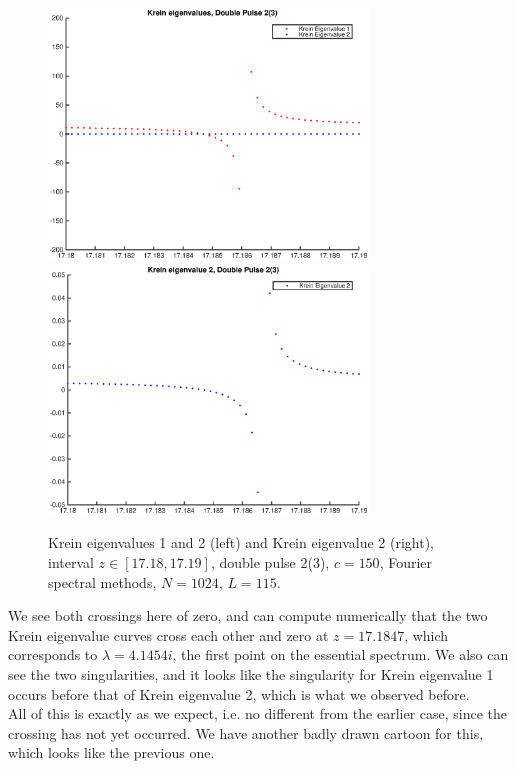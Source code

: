 \documentclass[12pt]{article}
\begin{document}
\begin{figure}[H]
	\includegraphics[width=8.5cm]{1500F_dp2_115_kreinzoom3.eps}
	\includegraphics[width=8.5cm]{1500F_dp2_115_kreinzoom4}
	\caption{Krein eigenvalues 1 and 2 (left) and Krein eigenvalue 2 (right), interval $z \in [17.18, 17.19]$, double pulse 2(3), $c = 150$, Fourier spectral methods, $N = 1024$, $L = 115$. }
\end{figure}

We see both crossings here of zero, and can compute numerically that the two Krein eigenvalue curves cross each other and zero at $z = 17.1847$, which corresponds to $\lambda = 4.1454i$, the first point on the essential spectrum. We also can see the two singularities, and it looks like the singularity for Krein eigenvalue 1 occurs before that of Krein eigenvalue 2, which is what we observed before.\\

All of this is exactly as we expect, i.e. no different from the earlier case, since the crossing has not yet occurred. We have another badly drawn cartoon for this, which looks like the previous one.
\end{document}
